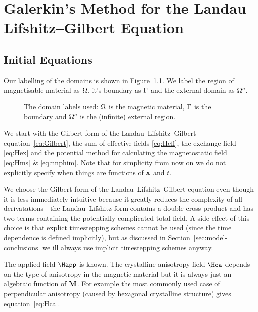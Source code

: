 
\chapter{Galerkin's Method for the Landau--Lifshitz--Gilbert Equation}
\label{sec:galerk-meth-llg}

\section{Initial Equations}
\label{sec:llg-initial-equations}

Our labelling of the domains is shown in Figure~\ref{fig:domain_labels}. We label the region of magnetisable material as $\Omega$, it's boundary as ${\Gamma}$ and the external domain as ${\Omega^c}$.

\begin{figure}[!ht]
  \center
  \caption{The domain labels used: $\Omega$ is the magnetic material, ${\Gamma}$ is the boundary and ${\Omega^c}$ is the (infinite) external region.} \label{fig:domain_labels}
\end{figure}

We start with the Gilbert form of the Landau--Lifshitz--Gilbert equation~\eqref{eq:Gilbert}, the sum of effective fields \eqref{eq:Heff}, the exchange field \eqref{eq:Hex} and the potential method for calculating the magnetostatic field \eqref{eq:Hms} \& \eqref{eq:nnphim}. Note that for simplicity from now on we do not explicitly specify when things are functions of $\mathbf{x}$ and $t$.

We choose the Gilbert form of the Landau--Lifshitz--Gilbert equation even though it is less immediately intuitive because it greatly reduces the complexity of all derivatations - the Landau--Lifshitz form contains a double cross product and has two terms containing the potentially complicated total field. A side effect of this choice is that explict timestepping schemes cannot be used (since the time dependence is defined implicitly), but as discussed in Section~\ref{sec:model-conclusions} we ill always use implicit timestepping schemes anyway.

The applied field $\Happ$ is known. The crystalline anisotropy field $\Hca$ depends on the type of anisotropy in the magnetic material but it is always just an algebraic function of $\mathbf{M}$. For example the most commonly used case of perpendicular anisotropy (caused by hexagonal crystalline structure) gives equation~\eqref{eq:Hca}.

